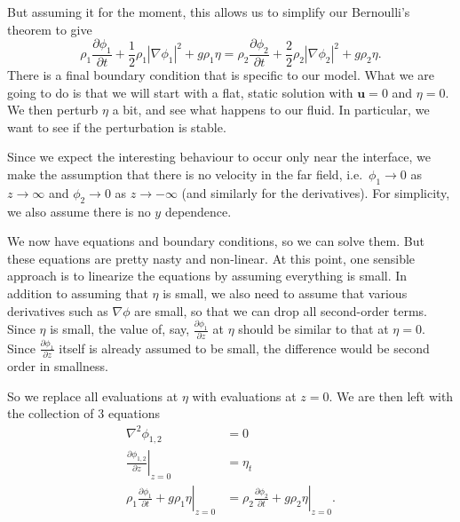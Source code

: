 \documentclass[a4paper]{article}
\begin{document}
But assuming it for the moment, this allows us to simplify our Bernoulli's theorem to give
\[
  \rho_1 \frac{\partial \phi_1}{\partial t} + \frac{1}{2} \rho_1 |\nabla \phi_1|^2 + g \rho_1 \eta = \rho_2 \frac{\partial \phi_2}{\partial t} + \frac{2}{2} \rho_2 |\nabla \phi_2|^2 + g \rho_2 \eta.
\]
There is a final boundary condition that is specific to our model. What we are going to do is that we will start with a flat, static solution with $\mathbf{u} = 0$ and $\eta = 0$. We then perturb $\eta$ a bit, and see what happens to our fluid. In particular, we want to see if the perturbation is stable.

Since we expect the interesting behaviour to occur only near the interface, we make the assumption that there is no velocity in the far field, i.e.\ $\phi_1 \to 0$ as $z \to \infty$ and $\phi_2 \to 0$ as $z \to-\infty$ (and similarly for the derivatives). For simplicity, we also assume there is no $y$ dependence.

We now have equations and boundary conditions, so we can solve them. But these equations are pretty nasty and non-linear. At this point, one sensible approach is to linearize the equations by assuming everything is small. In addition to assuming that $\eta$ is small, we also need to assume that various derivatives such as $\nabla \phi$ are small, so that we can drop all second-order terms. Since $\eta$ is small, the value of, say, $\frac{\partial \phi_1}{\partial z}$ at $\eta$ should be similar to that at $\eta = 0$. Since $\frac{\partial \phi_1}{\partial z}$ itself is already assumed to be small, the difference would be second order in smallness.

So we replace all evaluations at $\eta$ with evaluations at $z = 0$. We are then left with the collection of $3$ equations
\begin{align*}
  \nabla^2 \phi_{1, 2} &= 0\\
  \left.\frac{\partial \phi_{1, 2}}{\partial z}\right|_{z = 0} &= \eta_t\\
  \left.\rho_1 \frac{\partial \phi_1}{\partial t} + g \rho_1 \eta \right|_{z = 0} &= \left.\rho_2 \frac{\partial \phi_2}{\partial t} + g \rho_2 \eta \right|_{z = 0}.
\end{align*}
\end{document}
